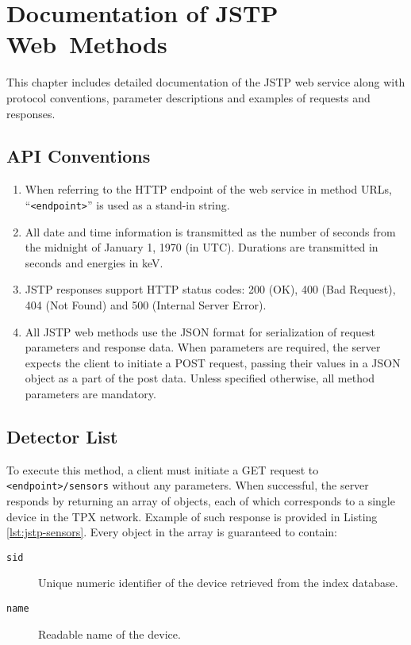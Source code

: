 \chapter{Documentation of JSTP Web~Methods}
\label{apx:jstp-doc}
This chapter includes detailed documentation of the JSTP web service along with protocol conventions, parameter descriptions and examples of requests and responses.

\section{API Conventions}
\begin{enumerate}
	\item
	When referring to the HTTP endpoint of the web service in method URLs, ``\texttt{<endpoint>}'' is used as a stand-in string.

	\item
	All date and time information is transmitted as the number of seconds from the midnight of January 1, 1970 (in UTC). Durations are transmitted in seconds and energies in keV.

	\item 
	JSTP responses support HTTP status codes: 200 (OK), 400 (Bad Request), 404 (Not Found) and 500 (Internal Server Error).

	\item
	All JSTP web methods use the JSON format for serialization of request parameters and response data. When parameters are required, the server expects the client to initiate a POST request, passing their values in a JSON object as a part of the post data. Unless specified otherwise, all method parameters are mandatory.
\end{enumerate}

\section{Detector List}
\label{apx:jstp-sensors}
To execute this method, a client must initiate a GET request to \texttt{<endpoint>/sensors} without any parameters. When successful, the server responds by returning an array of objects, each of which corresponds to a single device in the TPX network. Example of such response is provided in Listing \ref{lst:jstp-sensors}. Every object in the array is guaranteed to contain:
~
\begin{description}
	\item[\texttt{sid}]
	Unique numeric identifier of the device retrieved from the index database.

	\item[\texttt{name}]
	Readable name of the device.
\end{description}

